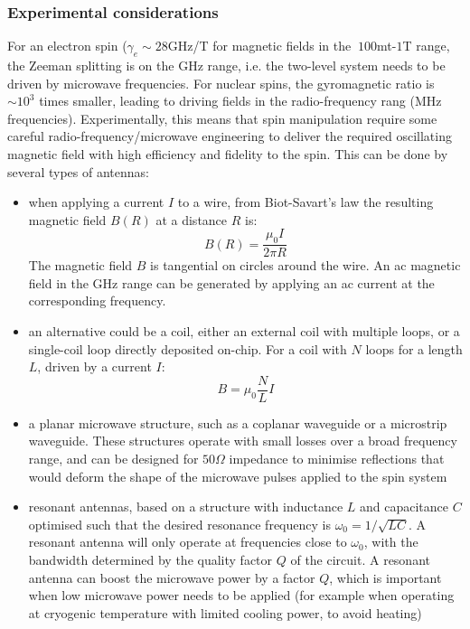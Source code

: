 \documentclass[a4paper,11pt]{article}
\begin{document}
\subsubsection{Experimental considerations}
For an electron spin ($\gamma_e \sim 28 $GHz/T for magnetic fields in the $~100$mt-$1$T range, the Zeeman splitting is on the GHz range, i.e. the two-level system needs to be driven by microwave frequencies. For nuclear spins, the gyromagnetic ratio is $\sim 10^3$ times smaller, leading to driving fields in the radio-frequency rang (MHz frequencies).
\newline Experimentally, this means that spin manipulation require some careful radio-frequency/microwave engineering to deliver the required oscillating magnetic field with high efficiency and fidelity to the spin. This can be done by several types of antennas:
\begin{itemize}
    \item when applying a current $I$ to a wire, from Biot-Savart's law the resulting magnetic field $B(R)$ at a distance $R$ is:
    \begin{equation}
        B(R) = \frac{\mu_0 I}{2 \pi R} 
    \end{equation}
    The magnetic field $B$ is tangential on circles around the wire. An ac magnetic field in the GHz range can be generated by applying an ac current at the corresponding frequency.
    
    \item an alternative could be a coil, either an external coil with multiple loops, or a single-coil loop directly deposited on-chip. For a coil with $N$ loops for a length $L$, driven by a current $I$:
    \begin{equation}
        B = \mu_0 \frac{N}{L} I
    \end{equation}
    
    \item a planar microwave structure, such as a coplanar waveguide or a microstrip waveguide. These structures operate with small losses over a broad frequency range, and can be designed for $50 \Omega$ impedance to minimise reflections that would deform the shape of the microwave pulses applied to the spin system
    
    \item resonant antennas, based on a structure with inductance $L$ and capacitance $C$ optimised such that the desired resonance frequency is $\omega_0 = 1/\sqrt{LC}$. A resonant antenna will only operate at frequencies close to $\omega_0$, with the bandwidth determined by the quality factor $Q$ of the circuit. A resonant antenna can boost the microwave power by a factor $Q$, which is important when low microwave power needs to be applied (for example when operating at cryogenic temperature with limited cooling power, to avoid heating)
\end{itemize}
\end{document}
